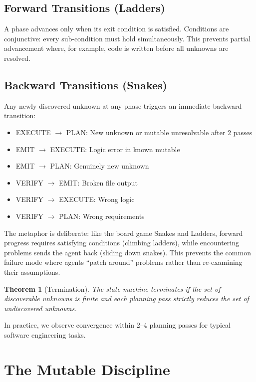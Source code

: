 \documentclass[11pt,twocolumn]{article}
\newtheorem{theorem}{Theorem}
\begin{document}
\subsection{Forward Transitions (Ladders)}

A phase advances only when its exit condition is satisfied. Conditions are conjunctive: every sub-condition must hold simultaneously. This prevents partial advancement where, for example, code is written before all unknowns are resolved.

\subsection{Backward Transitions (Snakes)}

Any newly discovered unknown at any phase triggers an immediate backward transition:

\begin{itemize}[nosep]
    \item EXECUTE $\to$ PLAN: New unknown or mutable unresolvable after 2 passes
    \item EMIT $\to$ EXECUTE: Logic error in known mutable
    \item EMIT $\to$ PLAN: Genuinely new unknown
    \item VERIFY $\to$ EMIT: Broken file output
    \item VERIFY $\to$ EXECUTE: Wrong logic
    \item VERIFY $\to$ PLAN: Wrong requirements
\end{itemize}

The metaphor is deliberate: like the board game Snakes and Ladders, forward progress requires satisfying conditions (climbing ladders), while encountering problems sends the agent back (sliding down snakes). This prevents the common failure mode where agents ``patch around'' problems rather than re-examining their assumptions.

\begin{theorem}[Termination]
The state machine terminates if the set of discoverable unknowns is finite and each planning pass strictly reduces the set of undiscovered unknowns.
\end{theorem}

In practice, we observe convergence within 2--4 planning passes for typical software engineering tasks.

\section{The Mutable Discipline}
\label{sec:mutable}
\end{document}
